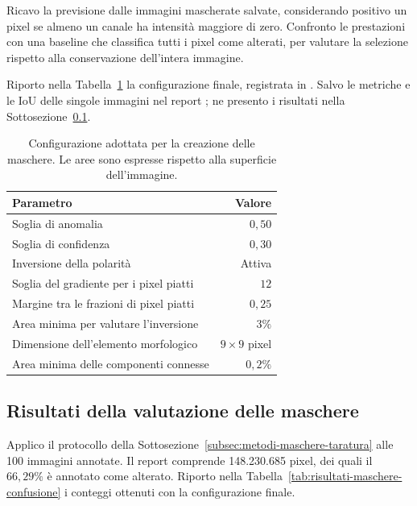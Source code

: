 Ricavo la previsione dalle immagini mascherate salvate, considerando positivo un pixel se almeno un canale ha intensità maggiore di zero. Confronto le prestazioni con una baseline che classifica tutti i pixel come alterati, per valutare la selezione rispetto alla conservazione dell'intera immagine.

Riporto nella Tabella~\ref{tab:metodi-maschere-parametri} la configurazione finale, registrata in . Salvo le metriche e le IoU delle singole immagini nel report ; ne presento i risultati nella Sottosezione~\ref{subsec:risultati-maschere}.

\begin{table}[htbp]
    \centering
    \small
    \caption{Configurazione adottata per la creazione delle maschere. Le aree sono espresse rispetto alla superficie dell'immagine.}
    \label{tab:metodi-maschere-parametri}
    \begin{tabular}{@{}lr@{}}
        \toprule
        Parametro & Valore \\
        \midrule
        Soglia di anomalia & $0{,}50$ \\
        Soglia di confidenza & $0{,}30$ \\
        Inversione della polarità & Attiva \\
        Soglia del gradiente per i pixel piatti & $12$ \\
        Margine tra le frazioni di pixel piatti & $0{,}25$ \\
        Area minima per valutare l'inversione & $3\%$ \\
        Dimensione dell'elemento morfologico & $9\times9$ pixel \\
        Area minima delle componenti connesse & $0{,}2\%$ \\
        \bottomrule
    \end{tabular}
\end{table}

\subsection{Risultati della valutazione delle maschere}
\label{subsec:risultati-maschere}

Applico il protocollo della Sottosezione~\ref{subsec:metodi-maschere-taratura} alle 100 immagini annotate. Il report  comprende 148.230.685 pixel, dei quali il $66{,}29\%$ è annotato come alterato. Riporto nella Tabella~\ref{tab:risultati-maschere-confusione} i conteggi ottenuti con la configurazione finale.

